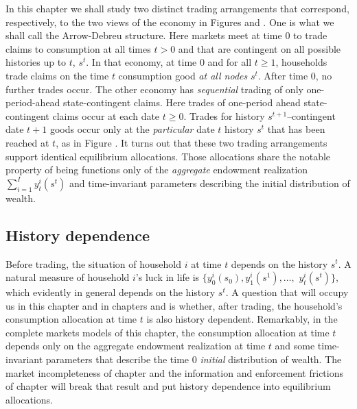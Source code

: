 In this chapter we shall study two distinct trading arrangements
that correspond, respectively,  to the two views of the economy in
Figures  and . %
One is
what we shall call the Arrow-Debreu structure.  Here  markets meet
at time $0$ to  trade claims to consumption at all times $t >0$
and that are contingent on all possible histories up to $t$,
$s^t$. In that economy, at time $0$ and for all $t \geq 1$, households trade claims on
the time $t$ consumption good {\it at all nodes\/} $s^t$. After
time $0$, no further trades occur.
     The other economy has {\it sequential\/} trading of
only one-period-ahead state-contingent claims. Here trades of one-period ahead state-contingent claims occur
at each date $t \geq 0$.   Trades for history
$s^{t+1}$--contingent date $t+1$ goods occur only at the {\it
particular\/}   date $t$ history $s^t$ that has been reached at
$t$, as in Figure .   %
 It turns out that  these two trading
arrangements support identical equilibrium allocations. Those
allocations share the notable property of  being functions only of
the {\it aggregate\/} endowment realization $\sum_{i=1}^I y_t^i(s^t)$ and time-invariant
parameters describing the initial distribution of wealth.






\subsection{History dependence}
Before trading, the situation of household $i$ at time $t$ depends on the history $s^t$.
  A natural measure of household
$i$'s luck in life is  $\{y^i_0(s_0), y^i_1(s^1), \ldots,$
$ y^i_t(s^t)\}$, which evidently in general depends on the history $s^t$. A
question that will occupy us in this chapter and in chapters
 and
 is whether, after trading, the household's
consumption allocation at time $t$ is also history dependent.  Remarkably, in
the complete markets models of this chapter, the consumption
allocation  at time $t$  depends only on the aggregate
endowment realization at time $t$ and some time-invariant parameters that describe the time $0$ {\it initial\/} distribution of wealth. The market incompleteness of chapter
 and the  information and enforcement frictions of
chapter  will break that result and put
history dependence into equilibrium allocations.




